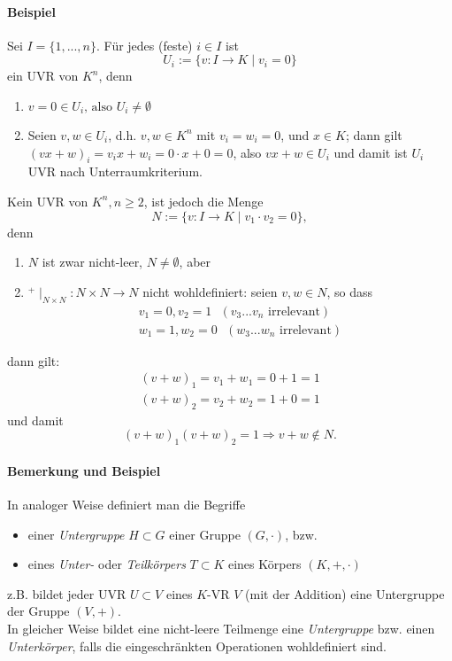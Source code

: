 \paragraph{Beispiel}
	Sei $I=\{1,...,n\}$. Für jedes (feste) $i\in I$ ist
		\[ U_i := \{v:I\to K\mid v_i =0\} \]
	ein UVR von $K^n$, denn
	\begin{enumerate}
		\item $v = 0 \in U_i\text{, also } U_i \neq \emptyset$
		\item Seien $v,w\in U_i$, d.h. $v,w\in K^n$ mit $v_i =w_i =0$, und $x\in K$; dann gilt $(vx+w)_i = v_ix+ w_i = 0\cdot x + 0 = 0$, also $vx+w\in U_i$ und damit ist $U_i$ UVR nach Unterraumkriterium.  
	\end{enumerate}
	Kein UVR von $K^n, n\geq 2$, ist jedoch die Menge
		\[ N:=\{v:I\to K\mid v_1\cdot v_2 = 0\}, \]
	denn 
	\begin{enumerate}
		\item $N$ ist zwar nicht-leer, $N\neq \emptyset$, aber
		\item $^+\mid_{N\times N}: N\times N\to N$ nicht wohldefiniert: seien $v,w\in N$, so dass
			\begin{gather*}
				v_1=0, v_2=1\text{ }(v_3 ... v_n \text{ irrelevant})\\
				w_1=1, w_2 = 0\text{ }(w_3 ... w_n \text{ irrelevant})
			\end{gather*}
	\end{enumerate}
	dann gilt:
	\begin{gather*}
		(v+w)_1 = v_1 + w_1 = 0+1=1\\
		(v+w)_2 = v_2 + w_2 = 1+0 = 1
	\end{gather*}
	und damit
		\[ (v+w)_1(v+w)_2 = 1 \Rightarrow v+w\notin N. \]

\paragraph{Bemerkung und Beispiel}
	In analoger Weise definiert man die Begriffe
	\begin{itemize}
		\item einer \emph{Untergruppe} $H\subset G$ einer Gruppe $(G,\cdot)$, bzw.
		\item eines \emph{Unter-} oder \emph{Teilkörpers} $T\subset K$ eines Körpers $(K,+,\cdot )$
	\end{itemize}
	
	z.B. bildet jeder UVR $U\subset V$ eines $K$-VR $V$ (mit der Addition) eine Untergruppe der Gruppe $(V,+)$.\\
        In gleicher Weise bildet eine nicht-leere Teilmenge eine \emph{Untergruppe} bzw. einen \emph{Unterkörper}, falls die eingeschränkten Operationen wohldefiniert sind.
    
